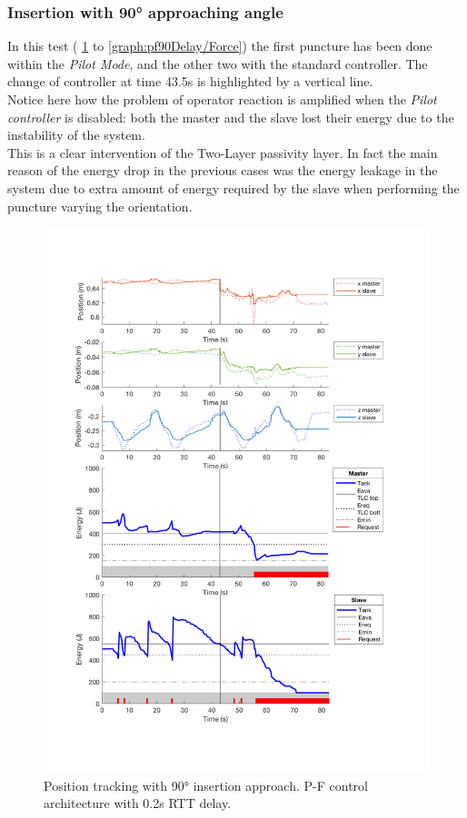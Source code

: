\subsubsection{Insertion with 90° approaching angle}\label{sec:insertion-with-90-approaching-angle}
In this test  (\figurename{ \ref{graph:pf90Delay/Position} to \ref{graph:pf90Delay/Force}}) the first puncture has been done within the \textit{Pilot Mode}, and the other two with the standard controller.
The change of controller at time 43.5s is highlighted by a vertical line.\\
Notice here how the problem of operator reaction is amplified when the \textit{Pilot controller} is disabled: both the master and the slave lost their energy due to the instability of the system.\\
This is a clear intervention of the Two-Layer passivity layer. In fact the main reason of the energy drop in the previous cases was the energy leakage in the system due to extra amount of energy required by the slave when performing the puncture varying the orientation. 
\begin{center}
	\begin{figure}
		\includegraphics[width=\textwidth, keepaspectratio]{plots/pf90Delay/Position.pdf}
		\caption{Position tracking with 90° insertion approach. P-F control architecture with 0.2s RTT delay.}
		\label{graph:pf90Delay/Position}
	\end{figure}
\end{center}
